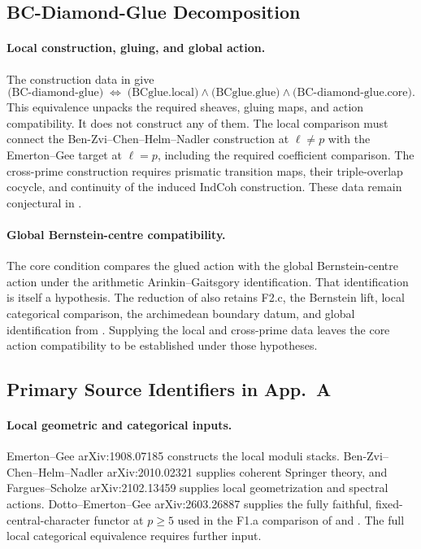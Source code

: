 \subsection{BC-Diamond-Glue Decomposition}
\label{v4-arith:w3-comparison-A:ch35}

\paragraph{Local construction, gluing, and global action.}
The construction data in
 give
\[
\text{(BC-diamond-glue)}
\;\Leftrightarrow\;
\text{(BCglue.local)}\wedge\text{(BCglue.glue)}
\wedge\text{(BC-diamond-glue.core)}.
\]
This equivalence unpacks the required sheaves, gluing maps, and
action compatibility. It does not construct any of them.
The local comparison must connect the Ben-Zvi--Chen--Helm--Nadler
construction at \(\ell\ne p\) with the Emerton--Gee target at
\(\ell=p\), including the required coefficient comparison.
The cross-prime construction requires prismatic transition maps,
their triple-overlap cocycle, and continuity of the induced
\(\mathrm{IndCoh}\) construction.
These data remain conjectural in
.

\paragraph{Global Bernstein-centre compatibility.}
The core condition compares the glued action with the global
Bernstein-centre action under the arithmetic Arinkin--Gaitsgory
identification. That identification is itself a hypothesis.
The reduction of
 also retains
F2.c, the Bernstein lift, local categorical comparison,
the archimedean boundary datum, and global identification from
.
Supplying the local and cross-prime data leaves the core action
compatibility to be established under those hypotheses.

\subsection{Primary Source Identifiers in App.~A}
\label{v4-arith:w3-comparison-A:appA}

\paragraph{Local geometric and categorical inputs.}
Emerton--Gee arXiv:1908.07185 constructs the local moduli stacks.
Ben-Zvi--Chen--Helm--Nadler arXiv:2010.02321 supplies coherent
Springer theory, and Fargues--Scholze arXiv:2102.13459 supplies
local geometrization and spectral actions.
Dotto--Emerton--Gee arXiv:2603.26887 supplies the fully faithful,
fixed-central-character functor at \(p\geq5\) used in the F1.a
comparison of  and .
The full local categorical equivalence requires further input.

